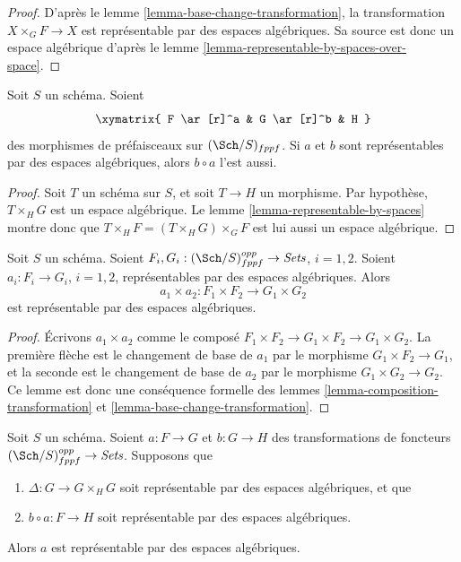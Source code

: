 \begin{proof}
D'après le lemme \ref{lemma-base-change-transformation}, la transformation
$X \times_G F \to X$ est représentable par des espaces algébriques. Sa source est donc
un espace algébrique d'après le
lemme \ref{lemma-representable-by-spaces-over-space}.
\end{proof}

\begin{lemma}
\label{lemma-composition-transformation}
Soit $S$ un schéma.
Soient
$$
\xymatrix{
F \ar[r]^a & G \ar[r]^b & H
}
$$
des morphismes de préfaisceaux sur $(\Sch/S)_{fppf}$.
Si $a$ et $b$ sont représentables par des espaces algébriques, alors
$b \circ a$ l'est aussi.
\end{lemma}

\begin{proof}
Soit $T$ un schéma sur $S$, et soit $T \to H$ un morphisme.
Par hypothèse, $T \times_H G$ est un espace algébrique. Le
lemme \ref{lemma-representable-by-spaces}
montre donc que $T \times_H F = (T \times_H G) \times_G F$ est lui aussi
un espace algébrique.
\end{proof}

\begin{lemma}
\label{lemma-product-transformations}
Soit $S$ un schéma.
Soient $F_i, G_i : (\Sch/S)_{fppf}^{opp} \to \textit{Sets}$, $i = 1, 2$.
Soient $a_i : F_i \to G_i$, $i = 1, 2$,
représentables par des espaces algébriques.
Alors
$$
a_1 \times a_2 : F_1 \times F_2 \longrightarrow G_1 \times G_2
$$
est représentable par des espaces algébriques.
\end{lemma}

\begin{proof}
Écrivons $a_1 \times a_2$ comme le composé
$F_1 \times F_2 \to G_1 \times F_2 \to G_1 \times G_2$.
La première flèche est le changement de base de $a_1$ par le morphisme
$G_1 \times F_2 \to G_1$, et la seconde
est le changement de base de $a_2$ par le morphisme
$G_1 \times G_2 \to G_2$. Ce lemme est donc une conséquence formelle des
lemmes \ref{lemma-composition-transformation}
et \ref{lemma-base-change-transformation}.
\end{proof}

\begin{lemma}
\label{lemma-representable-by-spaces-permanence}
Soit $S$ un schéma. Soient $a : F \to G$ et $b : G \to H$ des
transformations de foncteurs $(\Sch/S)_{fppf}^{opp} \to \textit{Sets}$.
Supposons que
\begin{enumerate}
\item $\Delta : G \to G \times_H G$ soit représentable
par des espaces algébriques, et que
\item $b \circ a : F \to H$ soit représentable par des espaces algébriques.
\end{enumerate}
Alors $a$ est représentable par des espaces algébriques.
\end{lemma}

